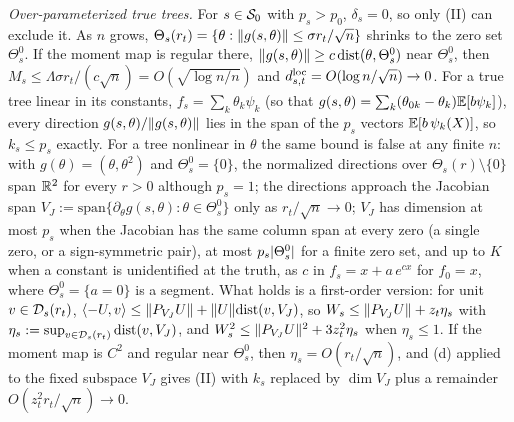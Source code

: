 \medskip\noindent\emph{Over-parameterized true trees.} For $s \in \mathcal{S}_0$ with $p_s > p_0$, $\delta_s = 0$, so only (II) can exclude it. As $n$ grows, $\Theta_s(r_t) = \{\theta : \lVert g(s,\theta)\rVert \le \sigma r_t/\sqrt n\}$ shrinks to the zero set $\Theta_s^0$. If the moment map is regular there, $\lVert g(s,\theta)\rVert \ge c\,\mathrm{dist}(\theta, \Theta_s^0)$ near $\Theta_s^0$, then $M_s \le \Lambda\sigma r_t/(c\sqrt n) = O(\sqrt{\log n/n})$ and $d^{\mathrm{loc}}_{s,t} = O(\log n/\sqrt n) \to 0$. For a true tree linear in its constants, $f_s = \sum_k\theta_k\psi_k$ (so that $g(s,\theta) = \sum_k(\theta_{0k} - \theta_k)\mathbb{E}[b\psi_k]$), every direction $g(s,\theta)/\lVert g(s,\theta)\rVert$ lies in the span of the $p_s$ vectors $\mathbb{E}[b\,\psi_k(X)]$, so $k_s \le p_s$ exactly. For a tree nonlinear in $\theta$ the same bound is false at any finite $n$: with $g(\theta) = (\theta, \theta^2)$ and $\Theta_s^0 = \{0\}$, the normalized directions over $\Theta_s(r) \setminus \{0\}$ span $\mathbb{R}^2$ for every $r > 0$ although $p_s = 1$; the directions approach the Jacobian span $V_J := \mathrm{span}\{\partial_\theta g(s,\theta) : \theta \in \Theta_s^0\}$ only as $r_t/\sqrt n \to 0$; $V_J$ has dimension at most $p_s$ when the Jacobian has the same column span at every zero (a single zero, or a sign-symmetric pair), at most $p_s\lvert \Theta_s^0\rvert$ for a finite zero set, and up to $K$ when a constant is unidentified at the truth, as $c$ in $f_s = x + a\,e^{cx}$ for $f_0 = x$, where $\Theta_s^0 = \{a = 0\}$ is a segment. What holds is a first-order version: for unit $v \in \mathcal{D}_s(r_t)$, $\langle -U, v\rangle \le \lVert P_{V_J}U\rVert + \lVert U\rVert\mathrm{dist}(v, V_J)$, so $W_s \le \lVert P_{V_J}U\rVert + z_t\eta_s$ with $\eta_s := \sup_{v \in \mathcal{D}_s(r_t)}\mathrm{dist}(v, V_J)$, and $W_s^2 \le \lVert P_{V_J}U\rVert^2 + 3z_t^2\eta_s$ when $\eta_s \le 1$. If the moment map is $C^2$ and regular near $\Theta_s^0$, then $\eta_s = O(r_t/\sqrt n)$, and (d) applied to the fixed subspace $V_J$ gives (II) with $k_s$ replaced by $\dim V_J$ plus a remainder $O(z_t^2r_t/\sqrt n) \to 0$.

